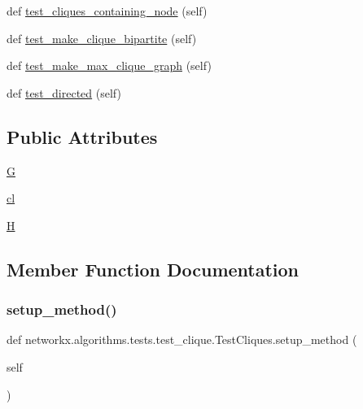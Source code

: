 \begin{DoxyCompactItemize}
\item 
def \hyperlink{classnetworkx_1_1algorithms_1_1tests_1_1test__clique_1_1TestCliques_aa8b71e4d4037d7cc4cfc3bae783b2397}{test\+\_\+cliques\+\_\+containing\+\_\+node} (self)
\item 
def \hyperlink{classnetworkx_1_1algorithms_1_1tests_1_1test__clique_1_1TestCliques_ab1b9d87c22151edfc60b685b2d6e8308}{test\+\_\+make\+\_\+clique\+\_\+bipartite} (self)
\item 
def \hyperlink{classnetworkx_1_1algorithms_1_1tests_1_1test__clique_1_1TestCliques_a5b987be0e30be0369d7a34c5f58263c1}{test\+\_\+make\+\_\+max\+\_\+clique\+\_\+graph} (self)
\item 
def \hyperlink{classnetworkx_1_1algorithms_1_1tests_1_1test__clique_1_1TestCliques_a40766415748fbfaae02654f665f1a03f}{test\+\_\+directed} (self)
\end{DoxyCompactItemize}
\subsection*{Public Attributes}
\begin{DoxyCompactItemize}
\item 
\hyperlink{classnetworkx_1_1algorithms_1_1tests_1_1test__clique_1_1TestCliques_ae47382ccbd197f54126834f9add002fc}{G}
\item 
\hyperlink{classnetworkx_1_1algorithms_1_1tests_1_1test__clique_1_1TestCliques_a61b37ea506e2ba3b572adab2873092ea}{cl}
\item 
\hyperlink{classnetworkx_1_1algorithms_1_1tests_1_1test__clique_1_1TestCliques_a7539f63c2dac0c586c2a659ae3779d29}{H}
\end{DoxyCompactItemize}


\subsection{Member Function Documentation}
\mbox{\label{classnetworkx_1_1algorithms_1_1tests_1_1test__clique_1_1TestCliques_ae0acf44c86d20f5071212d8b2c53f48d}} 
\subsubsection{\texorpdfstring{setup\+\_\+method()}{setup\_method()}}
{\footnotesize\ttfamily def networkx.\+algorithms.\+tests.\+test\+\_\+clique.\+Test\+Cliques.\+setup\+\_\+method (\begin{DoxyParamCaption}\item[{}]{self }\end{DoxyParamCaption})}

